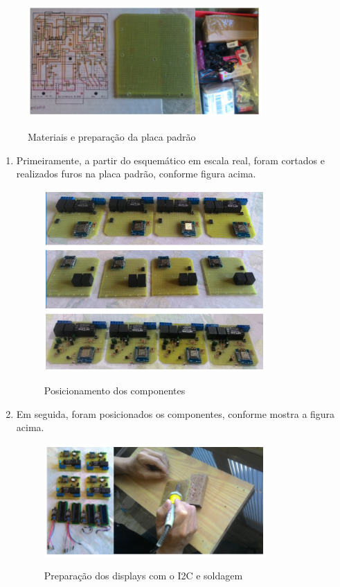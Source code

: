 \begin{figure}[H]
	\centering
	\caption{Materiais e preparação da placa padrão}
	\includegraphics[width=0.8\textwidth]{materiaisPrepPlaca}
	\label{fig:materiaisPrepPlaca}
\end{figure}

\begin{enumerate}
	\item Primeiramente, a partir do esquemático em escala real, foram cortados e realizados furos na placa padrão, conforme figura acima.

	\begin{figure}[H]
		\centering
		\caption{Posicionamento dos componentes}
		\includegraphics[width=0.8\textwidth]{PosicionamentoComp}
		\label{fig:PosicionamentoComp}
	\end{figure}

	\item Em seguida, foram posicionados os componentes, conforme mostra a figura acima.

	\begin{figure}[H]
		\centering
		\caption{Preparação dos displays com o I2C e soldagem}
		\includegraphics[width=0.8\textwidth]{PrepI2CSoldagem}
		\label{fig:PrepI2CSoldagem}
	\end{figure}


\end{enumerate}
